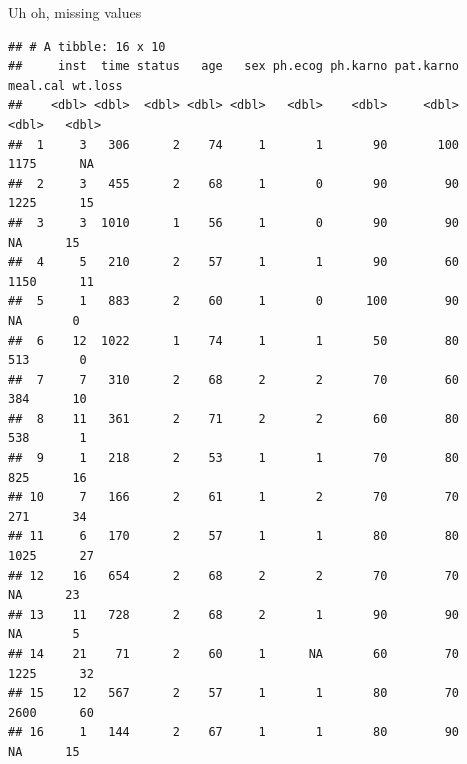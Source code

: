 \documentclass[
  ignorenonframetext,
]{beamer}
\newenvironment{Shaded}{\begin{snugshade}}{\end{snugshade}}
\newcommand{\DecValTok}[1]{\textcolor[rgb]{0.00,0.00,0.81}{#1}}
\newcommand{\KeywordTok}[1]{\textcolor[rgb]{0.13,0.29,0.53}{\textbf{#1}}}
\newcommand{\NormalTok}[1]{#1}
\newcommand{\OperatorTok}[1]{\textcolor[rgb]{0.81,0.36,0.00}{\textbf{#1}}}
\newcommand{\StringTok}[1]{\textcolor[rgb]{0.31,0.60,0.02}{#1}}
\begin{document}
\begin{frame}[fragile]{Uh oh, missing values}
\protect\hypertarget{uh-oh-missing-values}{}

\scriptsize

\begin{Shaded}
\end{Shaded}

\begin{verbatim}
## # A tibble: 16 x 10
##     inst  time status   age   sex ph.ecog ph.karno pat.karno meal.cal wt.loss
##    <dbl> <dbl>  <dbl> <dbl> <dbl>   <dbl>    <dbl>     <dbl>    <dbl>   <dbl>
##  1     3   306      2    74     1       1       90       100     1175      NA
##  2     3   455      2    68     1       0       90        90     1225      15
##  3     3  1010      1    56     1       0       90        90       NA      15
##  4     5   210      2    57     1       1       90        60     1150      11
##  5     1   883      2    60     1       0      100        90       NA       0
##  6    12  1022      1    74     1       1       50        80      513       0
##  7     7   310      2    68     2       2       70        60      384      10
##  8    11   361      2    71     2       2       60        80      538       1
##  9     1   218      2    53     1       1       70        80      825      16
## 10     7   166      2    61     1       2       70        70      271      34
## 11     6   170      2    57     1       1       80        80     1025      27
## 12    16   654      2    68     2       2       70        70       NA      23
## 13    11   728      2    68     2       1       90        90       NA       5
## 14    21    71      2    60     1      NA       60        70     1225      32
## 15    12   567      2    57     1       1       80        70     2600      60
## 16     1   144      2    67     1       1       80        90       NA      15
\end{verbatim}

\normalsize

\end{frame}
\end{document}
